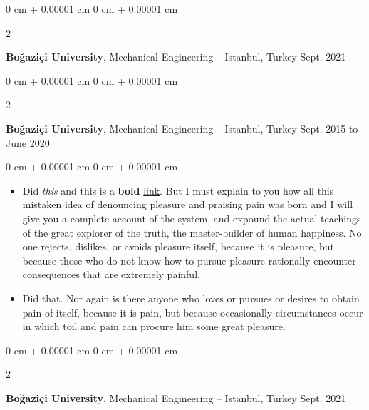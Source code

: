 \documentclass[10pt, letterpaper]{article}
\newenvironment{highlights}{
    \begin{itemize}[
        topsep=0.10 cm,
        parsep=0.10 cm,
        partopsep=0pt,
        itemsep=0pt,
        leftmargin=0 cm + 10pt
    ]
}{
    \end{itemize}
} %
\newenvironment{onecolentry}{
    \begin{adjustwidth}{
        0 cm + 0.00001 cm
    }{
        0 cm + 0.00001 cm
    }
}{
    \end{adjustwidth}
} %
\newenvironment{twocolentry}[2][]{
    \onecolentry
    \def\secondColumn{#2}
    \setcolumnwidth{\fill, 4.5 cm}
    \begin{paracol}{2}
}{
    \switchcolumn \raggedleft \secondColumn
    \end{paracol}
    \endonecolentry
} %
\begin{document}
        \vspace{0.2 cm}

        \begin{twocolentry}{
            Sept. 2021
        }
            \textbf{Boğaziçi University}, Mechanical Engineering -- Istanbul, Turkey\end{twocolentry}



        \vspace{0.2 cm}

        \begin{twocolentry}{
            Sept. 2015 to June 2020
        }
            \textbf{Boğaziçi University}, Mechanical Engineering -- Istanbul, Turkey\end{twocolentry}

        \vspace{0.10 cm}
        \begin{onecolentry}
            \begin{highlights}
                \item Did \textit{this} and this is a \textbf{bold} \href{https://example.com}{link}. But I must explain to you how all this mistaken idea of denouncing pleasure and praising pain was born and I will give you a complete account of the system, and expound the actual teachings of the great explorer of the truth, the master-builder of human happiness. No one rejects, dislikes, or avoids pleasure itself, because it is pleasure, but because those who do not know how to pursue pleasure rationally encounter consequences that are extremely painful.
                \item Did that. Nor again is there anyone who loves or pursues or desires to obtain pain of itself, because it is pain, but because occasionally circumstances occur in which toil and pain can procure him some great pleasure.
            \end{highlights}
        \end{onecolentry}


        \vspace{0.2 cm}

        \begin{twocolentry}{
            Sept. 2021
        }
            \textbf{Boğaziçi University}, Mechanical Engineering -- Istanbul, Turkey\end{twocolentry}
\end{document}
